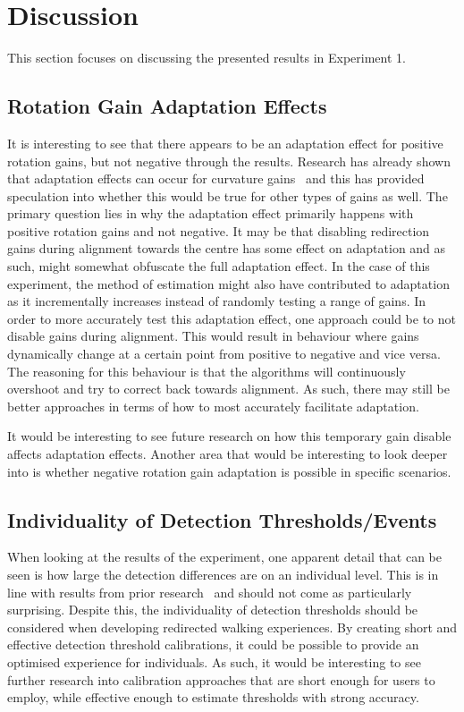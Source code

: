 \section{Discussion}
This section focuses on discussing the presented results in Experiment 1.

\subsection{Rotation Gain Adaptation Effects}
It is interesting to see that there appears to be an adaptation effect for positive rotation gains, but not negative through the results. Research has already shown that adaptation effects can occur for curvature gains~\cite{bolling2019shrinking} and this has provided speculation into whether this would be true for other types of gains as well. The primary question lies in why the adaptation effect primarily happens with positive rotation gains and not negative. It may be that disabling redirection gains during alignment towards the centre has some effect on adaptation and as such, might somewhat obfuscate the full adaptation effect. In the case of this experiment, the method of estimation might also have contributed to adaptation as it incrementally increases instead of randomly testing a range of gains. In order to more accurately test this adaptation effect, one approach could be to not disable gains during alignment. This would result in behaviour where gains dynamically change at a certain point from positive to negative and vice versa. The reasoning for this behaviour is that the algorithms will continuously overshoot and try to correct back towards alignment. As such, there may still be better approaches in terms of how to most accurately facilitate adaptation. 

It would be interesting to see future research on how this temporary gain disable affects adaptation effects. Another area that would be interesting to look deeper into is whether negative rotation gain adaptation is possible in specific scenarios. 

\subsection{Individuality of Detection Thresholds/Events}
When looking at the results of the experiment, one apparent detail that can be seen is how large the detection differences are on an individual level. This is in line with results from prior research~\cite{8446225, nguyen2018individual, schmitz2018you, fuglestad2018redirected} and should not come as particularly surprising. Despite this, the individuality of detection thresholds should be considered when developing redirected walking experiences. By creating short and effective detection threshold calibrations, it could be possible to provide an optimised experience for individuals. As such, it would be interesting to see further research into calibration approaches that are short enough for users to employ, while effective enough to estimate thresholds with strong accuracy. 

